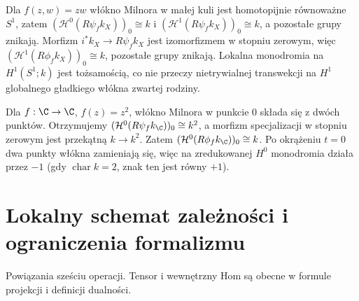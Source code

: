 \begin{przyklad}[Węzeł $zw=t$]
Dla $f(z,w)=zw$ włókno Milnora w małej kuli jest
homotopijnie równoważne $S^1$, zatem
$(\mathcal H^0(R\psi_fk_X))_0\cong k$ i
$(\mathcal H^1(R\psi_fk_X))_0\cong k$, a pozostałe grupy znikają.
Morfizm $i^*k_X\to R\psi_fk_X$ jest izomorfizmem
w stopniu zerowym, więc
$(\mathcal H^1(R\phi_fk_X))_0\cong k$, pozostałe grupy znikają.
Lokalna monodromia na $H^1(S^1;k)$ jest tożsamością,
co nie przeczy nietrywialnej transwekcji na
$H^1$ globalnego gładkiego włókna zwartej rodziny.
\end{przyklad}
\begin{przyklad}[Rozgałęzienie $z^2=t$]
Dla $f:\C\to\C$, $f(z)=z^2$, włókno Milnora w
punkcie $0$ składa się z dwóch punktów.
Otrzymujemy $(\mathcal H^0(R\psi_fk_\C))_0\cong k^2$, a
morfizm specjalizacji w stopniu zerowym jest przekątną
$k\to k^2$. Zatem $(\mathcal H^0(R\phi_fk_\C))_0\cong k$.
Po okrążeniu $t=0$ dwa punkty włókna zamieniają się,
więc na zredukowanej $H^0$ monodromia działa przez $-1$
(gdy $\operatorname{char}k=2$, znak ten jest równy $+1$).
\end{przyklad}

\section{Lokalny schemat zależności i ograniczenia formalizmu}
\begin{center}
\par\smallskip\small Powiązania sześciu operacji. Tensor i wewnętrzny Hom
są obecne w formule projekcji i definicji dualności.
\end{center}

